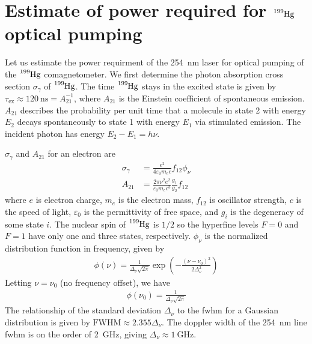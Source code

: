 
\chapter{
    \texorpdfstring{Estimate of power required for $\ce{^{199}Hg}$ optical pumping}
    {Estimate of power required for 199Hg optical pumping}\label{appx:199hg_pumping}
}


Let us estimate the power requirment of the \qty{254}{\nano\meter} laser for optical pumping of the $\ce{^199Hg}$ comagnetometer. We first determine the photon absorption cross section $\sigma_\gamma$ of $\ce{^199Hg}$. The time $\ce{^199Hg}$ stays in the excited state is given by $\tau_\text{ex}\approx \qty{120}{\nano\s}=A_{21}^{-1}$, where $A_{21}$ is the Einstein coefficient \cite{Hilborn1982} of spontaneous emission. $A_{21}$ describes the probability per unit time that a molecule in state 2 with energy $E_2$ decays spontaneously to state 1 with energy $E_1$ via stimulated emission. The incident photon has energy $E_2-E_1=h\nu$.

$\sigma_\gamma$ and $A_{21}$ for an electron are \cite{Hilborn1982}
%
\begin{align}
    \sigma_\gamma&=\frac{e^2}{4\varepsilon_0 m_e c}f_{12}\phi_\nu \label{eq:199hg_pumping_1}\\
    A_{21} &= \frac{2\pi \nu^2 e^2}{\varepsilon_0m_ec^3}\frac{g_1}{g_2}f_{12}\label{eq:199hg_pumping_2}
\end{align}
%
where $e$ is electron charge, $m_e$ is the electron mass, $f_{12}$ is oscillator strength, $c$ is the speed of light, $\varepsilon_0$ is the permittivity of free space, and $g_i$ is the degeneracy of some state $i$. The nuclear spin of $\ce{^199Hg}$ is $1/2$ so the hyperfine levels $F=0$ and $F=1$ have only one and three states, respectively. $\phi_\nu$ is the normalized distribution function in frequency, given by
%
\begin{gather}
    \phi(\nu)=\frac{1}{\Delta_\nu \sqrt{2\pi}}\exp \left( - \frac{(\nu-\nu_0)^2}{2\Delta^2_\nu}\right)
\end{gather}
%
Letting $\nu=\nu_0$ (no frequency offset), we have
%
\begin{gather}
    \phi(\nu_0)=\frac{1}{\Delta_\nu\sqrt{2\pi}}\label{eq:199hg_pumping_3}
\end{gather}
%
The relationship of the standard deviation $\Delta_\nu$ to the \acrshort{fwhm} for a Gaussian distribution is given by $\text{FWHM}\approx 2.355\Delta_\nu$. The doppler width of the \qty{254}{\nano\meter} line \acrshort{fwhm} is on the order of \qty{2}{\giga\Hz}, giving $\Delta_\nu\approx \qty{1}{\giga\Hz}$.

